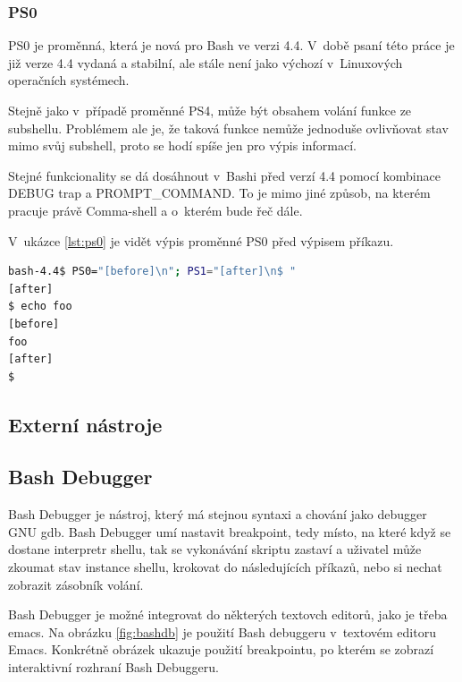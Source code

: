 \documentclass[thesis=M,czech]{FITthesis}[2012/06/26]
\begin{document}
%
%
%
\subsubsection{PS0}

PS0 je proměnná, která je nová pro Bash ve verzi 4.4. V~době psaní této práce je již verze 4.4 vydaná a stabilní, ale stále není jako výchozí v~Linuxových operačních systémech.

Stejně jako v~případě proměnné PS4, může být obsahem volání funkce ze subshellu. Problémem ale je, že taková funkce nemůže jednoduše ovlivňovat stav mimo svůj subshell, proto se hodí spíše jen pro výpis informací.

Stejné funkcionality se dá dosáhnout v~Bashi před verzí 4.4 pomocí kombinace DEBUG trap a PROMPT\_COMMAND. To je mimo jiné způsob, na kterém pracuje právě Comma-shell a o~kterém bude řeč dále.

V~ukázce \ref{lst:ps0} je vidět výpis proměnné PS0 před výpisem příkazu.

\begin{lstlisting}[language=bash, caption={ps0}, label={lst:ps0}]
bash-4.4$ PS0="[before]\n"; PS1="[after]\n$ "
[after]
$ echo foo
[before]
foo
[after]
$
\end{lstlisting}




\subsection{Externí nástroje}



\subsection{Bash Debugger}

Bash Debugger \cite{bashdb} je nástroj, který má stejnou syntaxi a chování jako debugger GNU gdb. Bash Debugger umí nastavit breakpoint, tedy místo, na které když se dostane interpretr shellu, tak se vykonávání skriptu zastaví a uživatel může zkoumat stav instance shellu, krokovat do následujících příkazů, nebo si nechat zobrazit zásobník volání.

Bash Debugger je možné integrovat do některých textovch editorů, jako je třeba emacs. Na obrázku \ref{fig:bashdb} je použití Bash debuggeru v~textovém editoru Emacs. Konkrétně obrázek ukazuje použití breakpointu, po kterém se zobrazí interaktivní rozhraní Bash Debuggeru.
\end{document}
